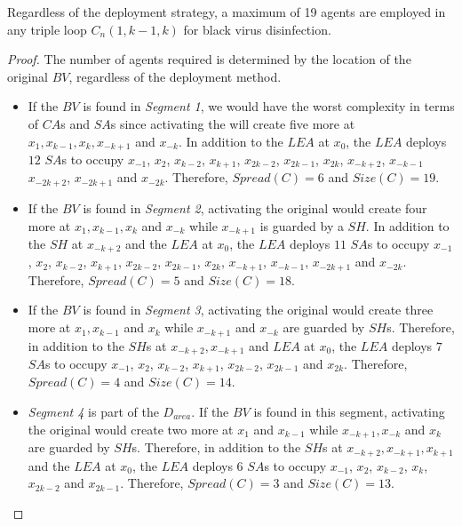 \begin{theorem}

Regardless of the deployment strategy,  a maximum of 19 agents are employed in any triple loop $C_n(1,k-1,k)$ for black virus disinfection.

\end{theorem}
\begin{proof}
The number of agents required is determined by the location of the original $BV$, regardless of the deployment method.
\begin{itemize} 
\item If  the $BV$ is found in {\em Segment 1},  we would have the worst complexity in terms of $CA$s and $SA$s since activating the \bv will create five more \bvs at $x_{1},x_{k-1},x_{k},x_{-k+1}$ and $x_{-k}$. In addition to the $LEA$ at $x_{0}$, the $LEA$ deploys $12$  $SA$s to occupy $x_{-1}$, $ x_{2}$,  $x_{k-2}$, $x_{k+1}$, $x_{2k-2}$, $x_{2k-1}$, $x_{2k}$, $x_{-k+2}$, $x_{-k-1}$  $x_{-2k+2}$, $x_{-2k+1}$ and  $x_{-2k}$. 
Therefore, $Spread(C)=6$ and $Size(C)=19$.  
 
\item If the $BV$ is found in {\em Segment 2}, activating the original \bv would create four more \bvs at $x_{1},x_{k-1},x_{k}$ and $x_{-k}$ while $x_{-k+1}$ is guarded by a $SH$. In addition to the $SH$ at $x_{-k+2}$ and the $LEA$ at $x_{0}$, the $LEA$ deploys $11$  $SA$s to occupy  $x_{-1}$, $ x_{2}$,  $x_{k-2}$, $x_{k+1}$, $x_{2k-2}$, $x_{2k-1}$, $x_{2k}$, $x_{-k+1}$,  $x_{-k-1}$, $x_{-2k+1}$ and $x_{-2k}$. Therefore, $Spread(C)=5$ and $Size(C)=18$.   

\item If the $BV$ is found in {\em Segment 3},  activating the original \bv would create three more \bvs at $x_{1},x_{k-1}$ and $x_{k}$ while $x_{-k+1}$ and $x_{-k}$ are guarded by $SH$s. Therefore, in addition to the $SH$s at $x_{-k+2},x_{-k+1}$ and $LEA$ at $x_{0}$, the $LEA$ deploys $7$  $SA$s to occupy $x_{-1}$, $ x_{2}$,  $x_{k-2}$, $x_{k+1}$, $x_{2k-2}$, $x_{2k-1}$ and $x_{2k}$. Therefore, $Spread(C)=4$ and $Size(C)=14$.   
 
\item {\em Segment 4} is part of  the $D_{area}$. If the $BV$ is found in this segment, activating the original \bv would create two more \bvs at $x_{1}$ and $x_{k-1}$ while $x_{-k+1},x_{-k}$ and $x_{k}$ are guarded by $SH$s. Therefore, in addition to the $SH$s at $x_{-k+2},x_{-k+1},x_{k+1}$ and the $LEA$ at $x_{0}$, the $LEA$ deploys $6$  $SA$s to occupy  $x_{-1}$, $ x_{2}$,  $x_{k-2}$, $x_{k}$,  $x_{2k-2}$ and $x_{2k-1}$. Therefore, $Spread(C)=3$ and $Size(C)=13$.   


\end{itemize}
\end{proof}
